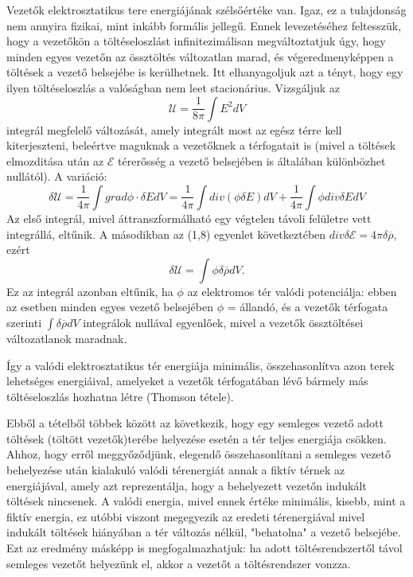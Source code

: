 \documentclass{article}
\begin{document}
Vezetők elektrosztatikus tere energiájának szélsőértéke van. Igaz, ez a tulajdonság nem annyira fizikai, mint inkább formális jellegű. Ennek levezetéséhez feltesszük, hogy a vezetőkön a töltéseloszlást infinitezimálisan megváltoztatjuk úgy, hogy minden egyes vezetőn az össztöltés változatlan marad, és végeredmenyképpen a töltések a vezető belsejébe is kerülhetnek. Itt elhanyagoljuk azt a tényt, hogy egy ilyen töltéseloszlás a valóságban nem leet stacionárius. Vizsgáljuk az
\begin{equation} \label{eq:18}
    \mathcal{U} = \frac{1}{8 \pi} \int E^2dV
\end{equation}
integrál megfelelő változását, amely integrált most az egész térre kell kiterjeszteni, beleértve maguknak a vezetőknek a térfogatait is (mivel a töltések elmozditása után az $\mathcal{E}$ térerősség a vezető belsejében is általában különbözhet nullától). A variáció:
\begin{equation} \label{eq:19}
    \delta \mathcal{U} = \frac{1}{4 \pi} \int grad \phi \cdot \delta EdV = \frac{1}{4\pi} \int div(\phi \delta E)dV + \frac{1}{4\pi} \int \phi div \delta EdV
\end{equation}
Az első integrál, mivel áttranszformálható egy végtelen távoli felületre vett integrállá, eltűnik. A másodikban az (1,8) egyenlet következtében $div \delta \mathcal{E} = 4 \pi \delta \overline\rho$, ezért
\begin{equation} \label{eq:20}
    \delta \mathcal{U} = \int \phi \delta \overline{\rho}dV.
\end{equation}
Ez az integrál azonban eltűnik, ha $\phi$ az elektromos tér valódi potenciálja: ebben az esetben minden egyes vezető belsejében $\phi$ = állandó, és a vezetők térfogata szerinti $\int \delta \overline{\rho} dV$ integrálok nullával egyenlőek, mivel a vezetők össztöltései változatlanok maradnak.

Így a valódi elektrosztatikus tér energiája minimális, összehasonlítva azon terek lehetséges energiáival, amelyeket a vezetők térfogatában lévő bármely más töltéseloszlás hozhatna létre (Thomson tétele).

Ebből a tételből többek között az következik, hogy egy semleges vezető adott töltések (töltött vezetők)terébe helyezése esetén a tér teljes energiája csökken. Ahhoz, hogy erről meggyőződjünk, elegendő összehasonlítani a semleges vezető behelyezése után kialakuló valódi térenergiát annak a fiktív térnek az energiájával, amely azt reprezentálja, hogy a behelyezett vezetőn indukált töltések nincsenek. A valódi energia, mivel ennek értéke minimális, kisebb, mint a fiktív energia, ez utóbbi viszont megegyezik az eredeti térenergiával mivel indukált töltések hiányában a tér változás nélkül, "behatolna" a vezető belsejébe. Ezt az eredmény másképp is megfogalmazhatjuk: ha adott töltésrendszertől távol semleges vezetőt helyezünk el, akkor a vezetőt a töltésrendszer vonzza.
\end{document}
